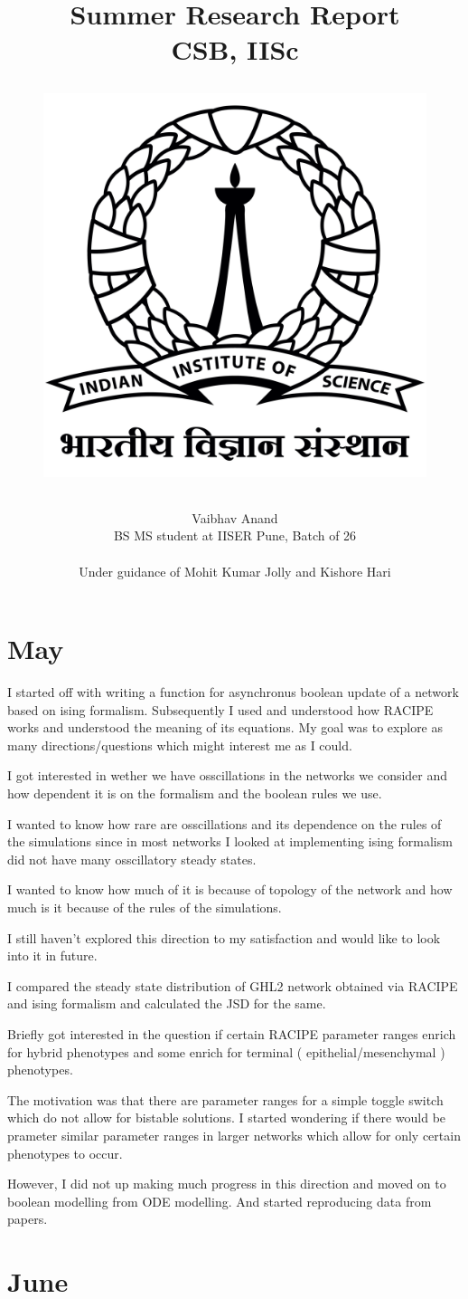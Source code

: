 \documentclass{report}
\title{{Summer Research Report} \\ {CSB, IISc}

\begin{figure}[H]\centering
	\includegraphics[scale=0.05]{img/IIsc_logo.png}

\end{figure}

}
\author{Vaibhav Anand \\ 
BS MS student at IISER Pune, Batch of 26
\\

~\\
Under guidance of Mohit Kumar Jolly and Kishore Hari }
\begin{document}
\maketitle

\chapter*{May}
I started off with writing a function for asynchronus boolean update of a network based on ising formalism. Subsequently I used and understood how RACIPE works and understood the meaning of its equations. My goal was to explore as many directions/questions which might interest me as I could. 

I got interested in wether we have osscillations in the networks we consider and how dependent it is on the formalism and the boolean rules we use. 

I wanted to know how rare are osscillations and its dependence on the rules of the simulations since in most networks I looked at implementing ising formalism did not have many osscillatory steady states. 

I wanted to know how much of it is because of topology of the network and how much is it because of the rules of the simulations. 



I still haven't explored this direction to my satisfaction and would like to look into it in future. 


I compared the steady state distribution of GHL2 network obtained via RACIPE and ising formalism and calculated the JSD for the same. 

 


Briefly got interested in the question if certain RACIPE parameter ranges enrich for hybrid phenotypes and some enrich for terminal ( epithelial/mesenchymal ) phenotypes. 

The motivation was that there are parameter ranges for a simple toggle switch which do not allow for bistable solutions. I started wondering if there would be prameter similar parameter ranges in larger networks which allow for only certain phenotypes to occur. 

However, I did not up making much progress in this direction and moved on to boolean modelling from ODE modelling. And started reproducing data from papers. 

\chapter*{June }
\end{document}
